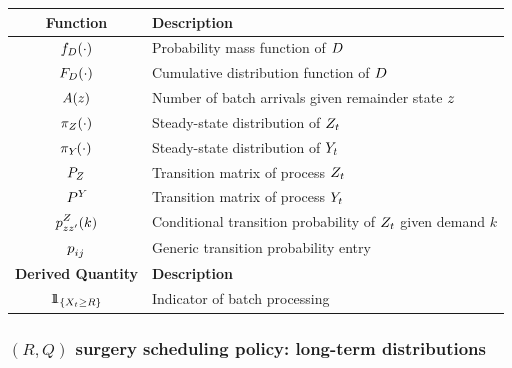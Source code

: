 \begin{table}[htb]
\begin{tabular}{cl}
    \textbf{Function} & \textbf{Description} \\
    \midrule
    $f_{D}(\cdot)$ & Probability mass function of $D$ \\
    $F_{D}(\cdot)$ & Cumulative distribution function of $D$ \\
    $A(z)$ & Number of batch arrivals given remainder state $z$ \\
    $\pi_{Z_{}}(\cdot)$ & Steady-state distribution of $Z_{t}$ \\
    $\pi_{Y_{}}(\cdot)$ & Steady-state distribution of $Y_{t}$ \\
    $P_{Z_{}}$ & Transition matrix of process $Z_{t}$ \\
    $P_{}^{Y_{}}$ & Transition matrix of process $Y_{t}$ \\
    $p_{zz'}^{Z_{}}(k)$ & Conditional transition probability of $Z_{t}$ given demand $k$ \\
    $p_{ij}^{}$ & Generic transition probability entry \\
    \midrule

    \textbf{Derived Quantity} & \textbf{Description} \\
    \midrule
    ${1\kern-.3468em{ 1}}_{\{X_{t} \ge R\}}$ & Indicator of batch processing \\
    \bottomrule
    \end{tabular}
\end{table}

\subsubsection{$(R,Q)$ surgery scheduling policy: long-term distributions\label{sec:rqtheory}}

